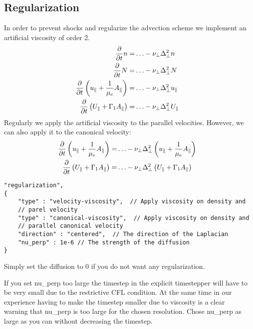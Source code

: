 \subsection{Regularization} \label{sec:regularization}
In order to prevent shocks and regularize the advection scheme
we implement an artificial viscosity of order 2.
\begin{align}
    \frac{\partial}{\partial t} n  =& \ldots -\nu_\perp \Delta_\perp^2 n 
\\
\frac{\partial}{\partial t} N =& \ldots -\nu_\perp \Delta_\perp^2 N
 \\
\frac{\partial}{\partial t} \left( u_\parallel+ \frac{1}{\mu_e} A_\parallel \right) =&
\ldots -\nu_\perp \Delta_\perp^2 u_\parallel
      \\
      \frac{\partial}{\partial t} \left( U_\parallel+ \Gamma_1 A_\parallel  \right) =& \ldots -\nu_\perp \Delta_\perp^2 U_\parallel
\end{align}
Regularly we apply the artificial viscosity to the parallel velocities. However,
we can also apply it to the canonical velocity:
\begin{align}
\frac{\partial}{\partial t} \left( u_\parallel+ \frac{1}{\mu_e} A_\parallel \right) =&
\ldots -\nu_\perp \Delta_\perp^2 \left( u_\parallel+ \frac{1}{\mu_e} A_\parallel \right)
      \\
      \frac{\partial}{\partial t} \left( U_\parallel+ \Gamma_1 A_\parallel  \right) =& \ldots -\nu_\perp \Delta_\perp^2 \left( U_\parallel+ \Gamma_1 A_\parallel  \right)
\end{align}

\begin{verbatim}
"regularization",
{
    "type" : "velocity-viscosity",  // Apply viscosity on density and
    // parel velocity
    "type" : "canonical-viscosity",  // Apply viscosity on density and
    // parallel canonical velocity
    "direction" : "centered",  // The direction of the Laplacian
    "nu_perp" : 1e-6 // The strength of the diffusion
}
\end{verbatim}
Simply set the diffusion to 0 if you do not want any regularization.
\begin{tcolorbox}[title=Note]
    If you set nu\_perp too large the timestep in the explicit timestepper will
    have to be very small due to the restrictive CFL condition. At the same
    time in our experience having to make the timestep smaller due to viscosity
    is a clear warning that nu\_perp is too large for the chosen resolution.
    Chose nu\_perp as large as you can without decreasing the timestep.
\end{tcolorbox}

